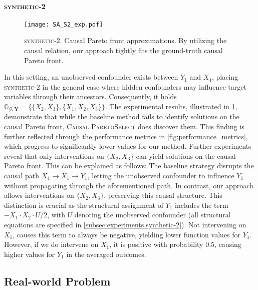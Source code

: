 \paragraph{\textsc{synthetic-2}} 
\begin{figure}[t]
\centering
\vspace{-1.8cm}
\texttt{[image: SA\_S2\_exp.pdf]}
\vspace{-2.6cm}
\caption{\textsc{synthetic-2}. Causal Pareto front approximations. By utilizing the causal relation, our approach tightly fits the ground-truth causal Pareto front.}
\label{fig:synthetic2_fronts}
\end{figure}
In this setting, an unobserved confounder exists between $Y_1$ and $X_4$, placing \textsc{synthetic-2} in the general case where hidden confounders may influence target variables through their ancestors. Consequently, it holds $\mathbb{O}_{\mathcal{G},\mathbf{Y}}=\{ \{X_2,X_3\}, \{X_1,X_2,X_3\} \}$. The experimental results, illustrated in \cref{fig:synthetic2_fronts}, demonstrate that while the baseline method fails to identify solutions on the causal Pareto front, \textsc{Causal ParetoSelect} does discover them. This finding is further reflected through the performance metrics in \cref{fig:performance_metrics}, which progress to significantly lower values for our method. %
Further experiments reveal that only interventions on $\{ X_2,X_3\}$ can yield solutions on the causal Pareto front. This can be explained as follows: The baseline strategy disrupts the causal path $X_4 \rightarrow X_1 \rightarrow Y_1$, letting the unobserved confounder to influence $Y_1$ without propagating through the aforementioned path. In contrast, our approach allows interventions on $\{X_2,X_3\}$, preserving this causal structure. This distinction is crucial as the structural assignment of $Y_1$ includes the term $-X_1 \cdot X_2 \cdot U/2$, with $U$ denoting the unobserved confounder (all structural equations are specified in \cref{subsec:experiments.synthetic-2}). Not intervening on $X_1$, causes this term to always be negative, yielding lower function values for $Y_1$. However, if we do intervene on $X_1$, it is positive with probability $0.5$, causing higher values for $Y_1$ in the averaged outcomes. 


\subsection{Real-world Problem}

